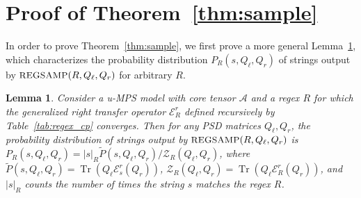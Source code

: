 \documentclass[twoside]{article}
\newtheorem{lemma}{Lemma}
\newcommand{\Sample}{\textsc{\small REGSAMP}}
\DeclareMathOperator{\Tr}{Tr}
\newcommand{\ER}{\mc{E}^{\scriptstyle r}}
\newcommand{\QL}{Q_{\ell}}
\newcommand{\QR}{Q_{r}}
\newcommand{\sR}{|s|_R}
\newcommand{\Pt}{\tilde{P}}
\newcommand{\mc}[1]{\mathcal{#1}}
\begin{document}
\section{Proof of Theorem~\ref{thm:sample}}
\label{sec:appendix_b}

In order to prove Theorem~\ref{thm:sample}, 
we first prove a more general Lemma~\ref{lem:sample}, which characterizes the probability distribution $P_R(s, \QL, \QR)$ of strings output by $\Sample(R, \QL, \QR)$ for arbitrary $R$.
%
\begin{lemma}
\label{lem:sample}
Consider a u-MPS model with core tensor $\mc{A}$ and a regex $R$ for which the generalized right transfer operator $\ER_R$ defined recursively by Table~\ref{tab:regex_cp} 
converges. Then for any PSD matrices $\QL, \QR$, the probability distribution of strings output by $\Sample(R, \QL, \QR)$ is $P_R(s, \QL, \QR) = \sR \Pt(s, \QL, \QR) / \mc{Z}_R(\QL, \QR)$, where $\Pt(s, \QL, \QR) = \Tr(\QL \ER_s(\QR))$, $\mc{Z}_R(\QL, \QR) = \Tr(\QL \ER_R(\QR))$, and $\sR$ counts the number of times the string $s$ matches the regex $R$.
\end{lemma}
\end{document}
